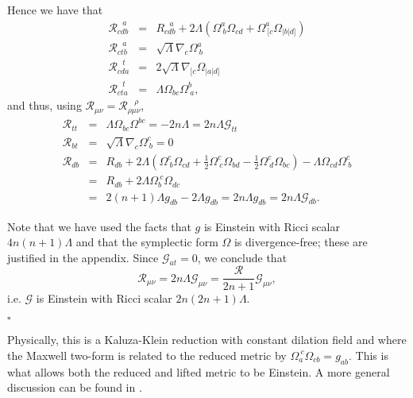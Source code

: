 Hence we have that
\begin{eqnarray*}
\mathcal{R}_{cdb}^{\ \ \ a} & = & R_{cdb}^{\ \ \ a}+2\Lambda(\Omega_{\ b}^{a}\Omega_{cd}+\Omega_{\ [c}^{a}\Omega_{|b|d]})\\
\mathcal{R}_{ctb}^{\ \ \ a} & = & \sqrt{\Lambda}\nabla_{c}\Omega_{\ b}^{a}\\
\mathcal{R}_{cda}^{\ \ \ t} & = & 2\sqrt{\Lambda}\nabla_{[c}\Omega_{|a|d]}\\
\mathcal{R}_{cta}^{\ \ \ t} & = & \Lambda\Omega_{bc}\Omega_{\ a}^{b},
\end{eqnarray*}
and thus, using $\mathcal{R}_{\mu\nu}=\mathcal{R}_{\rho\mu\nu}^{\ \ \ \ \rho}$,
\begin{eqnarray*}
\mathcal{R}_{tt} & = & \Lambda\Omega_{bc}\Omega^{bc}=-2n\Lambda=2n\Lambda\mathcal{G}_{tt}\\
\mathcal{R}_{bt} & = & \sqrt{\Lambda}\nabla_{c}\Omega_{\ b}^{c}=0\\
\mathcal{R}_{db} & = & R_{db}+2\Lambda(\Omega_{\ b}^{c}\Omega_{cd}+\frac{1}{2}\Omega_{\ c}^{c}\Omega_{bd}-\frac{1}{2}\Omega_{\ d}^{c}\Omega_{bc})-\Lambda\Omega_{cd}\Omega_{\ b}^{c}\\
 & = & R_{db}+2\Lambda\Omega_{b}^{\ c}\Omega_{dc}\\
 & = & 2(n+1)\Lambda g_{db}-2\Lambda g_{db}=2n\Lambda g_{db}=2n\Lambda\mathcal{G}_{db}.
\end{eqnarray*}


Note that we have used the facts that $g$ is Einstein with Ricci
scalar $4n(n+1)\Lambda$ and that the symplectic form $\Omega$ is divergence-free;
these are justified in the appendix. Since $\mathcal{G}_{at}=0$,
we conclude that
\[
\mathcal{R}_{\mu\nu}=2n\Lambda\mathcal{G}_{\mu\nu}=\frac{\mathcal{R}}{2n+1}\mathcal{G}_{\mu\nu},
\]
i.e. $\mathcal{G}$ is Einstein with Ricci scalar $2n(2n+1)\Lambda$.

\begin{flushright}
$\square$
\par\end{flushright}

Physically, this is a Kaluza-Klein reduction with constant dilation
field and where the Maxwell two-form is related to the reduced metric
by $\Omega_{a}^{\ c}\Omega_{cb}=g_{ab}$. This is what allows both
the reduced and lifted metric to be Einstein. A more general discussion
can be found in \cite{Pope}.

